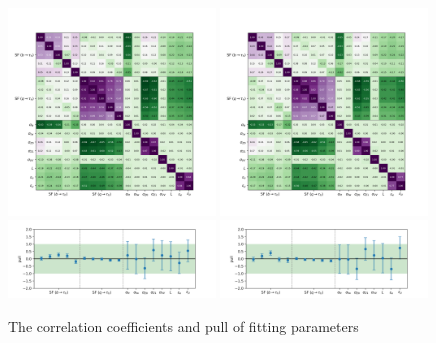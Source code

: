 \begin{figure}
    \centering
    \includegraphics[width=0.49\textwidth]{appendices/jetToTauhReweighting/figures/corr2_lltauTight_splitJetFlavor.png}
    \includegraphics[width=0.49\textwidth]{appendices/jetToTauhReweighting/figures/corr2_lltauVTight_splitJetFlavor.png}
    \includegraphics[width=0.49\textwidth]{appendices/jetToTauhReweighting/figures/pull2_lltauTight_splitJetFlavor.png}
    \includegraphics[width=0.49\textwidth]{appendices/jetToTauhReweighting/figures/pull2_lltauVTight_splitJetFlavor.png}
    \caption{The correlation coefficients and pull of fitting parameters}
    \label{fig:appendix:fakeTauId:fitparam}
\end{figure}

